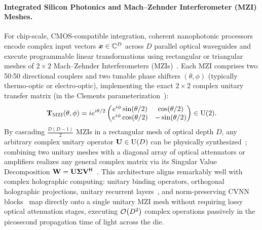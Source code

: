 \paragraph{Integrated Silicon Photonics and Mach--Zehnder Interferometer (MZI) Meshes.}
For chip-scale, CMOS-compatible integration, coherent nanophotonic processors encode complex input vectors $\boldsymbol{x} \in \mathbb{C}^D$ across $D$ parallel optical waveguides and execute programmable linear transformations using rectangular or triangular meshes of $2 \times 2$ Mach--Zehnder Interferometers (MZIs)~\cite{SHEN_PHOTONIC_MZI,CLEMENTS_2016_MZI}.
Each MZI comprises two 50:50 directional couplers and two tunable phase shifters $(\theta, \phi)$ (typically thermo-optic or electro-optic), implementing the exact $2 \times 2$ complex unitary transfer matrix (in the Clements parameterization~\cite{CLEMENTS_2016_MZI}):
\begin{equation}\label{eq:mzi_unitary}
    \mathbf{T}_{\text{MZI}}(\theta, \phi) = i e^{i\theta/2}
    \begin{pmatrix}
        e^{i\phi}\sin(\theta/2) & \cos(\theta/2) \\
        e^{i\phi}\cos(\theta/2) & -\sin(\theta/2)
    \end{pmatrix}
    \in \mathrm{U}(2).
\end{equation}
By cascading $\frac{D(D-1)}{2}$ MZIs in a rectangular mesh of optical depth $D$, any arbitrary complex unitary operator $\mathbf{U} \in \mathrm{U}(D)$ can be physically synthesized~\cite{CLEMENTS_2016_MZI}; combining two unitary meshes with a diagonal array of optical attenuators or amplifiers realizes any general complex matrix via its Singular Value Decomposition $\mathbf{W} = \mathbf{U}\mathbf{\Sigma}\mathbf{V}^{\mathsf{H}}$~\cite{SHEN_PHOTONIC_MZI}.
This architecture aligns remarkably well with complex holographic computing: unitary binding operators, orthogonal holographic projections, unitary recurrent layers~\cite{ARJOVSKY_2016_URNN}, and norm-preserving CVNN blocks~\cite{BASSEY_CVNN_SURVEY,TRABELSI_2018_DCN} map directly onto a single unitary MZI mesh without requiring lossy optical attenuation stages, executing $\mathcal{O}\!\left(D^2\right)$ complex operations passively in the picosecond propagation time of light across the die.

